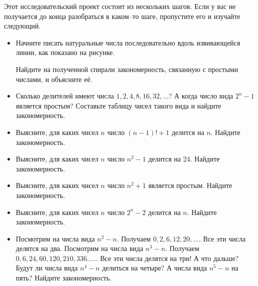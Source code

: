 
Этот исследовательский проект состоит из нескольких шагов. Если у вас не получается до конца разобраться в каком--то шаге, пропустите его и изучайте следующий. 
\begin{itemize}
\item Начните писать натуральные числа последовательно вдоль извивающейся линии, как показано на рисунке.

\begin{center}  \end{center}

Найдите на полученной спирали закономерность, связанную с простыми числами, и объясните её.
\item Сколько делителей имеют числа $1, 2, 4, 8, 16, 32, \ldots$? А когда число вида $2^n - 1$ является простым? Составьте таблицу чисел такого вида и найдите закономерность.
\item Выясните, для каких чисел $n$ число $(n-1)!+1$ делится на $n$. Найдите закономерность.
\item Выясните, для каких чисел $n$ число $n^2-1$ делится на 24. Найдите закономерность. 
\item Выясните, для каких чисел $n$ число $n^2+1$ является простым. Найдите закономерность. 
\item Выясните, для каких чисел $n$ число $2^n-2$ делится на $n$. Найдите закономерность.
\item Посмотрим на числа вида $n^2-n$. Получаем $0,2,6,12,20,\ldots$. Все эти числа делятся на два. Посмотрим на числа вида $n^3-n$. Получаем $0, 6, 24, 60, 120, 210, 336, \ldots$. Все эти числа делятся на три! А что дальше? Будут ли числа вида $n^4-n$ делиться на четыре? А числа вида $n^5-n$ на пять? Найдите закономерность.
\end{itemize}